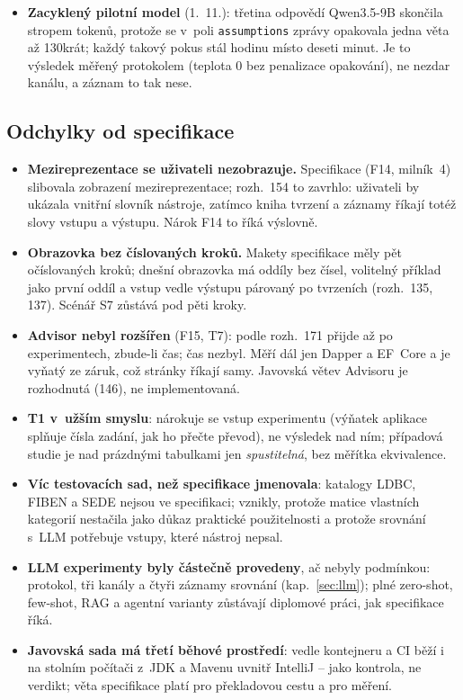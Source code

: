 \documentclass{article}
\begin{document}
\begin{itemize}[leftmargin=*,itemsep=2pt]
\item \textbf{Zacyklený pilotní model} (1.~11.): třetina odpovědí Qwen3.5-9B skončila stropem tokenů, protože se v~poli \texttt{assumptions} zprávy opakovala jedna věta až 130krát; každý takový pokus stál hodinu místo deseti minut. Je to výsledek měřený protokolem (teplota 0 bez penalizace opakování), ne nezdar kanálu, a záznam to tak nese.
\end{itemize}

\subsection{Odchylky od specifikace}\label{sec:odchylky}

\begin{itemize}[leftmargin=*,itemsep=2pt]
\item \textbf{Mezireprezentace se uživateli nezobrazuje.} Specifikace (F14, milník~4) slibovala zobrazení mezireprezentace; rozh.~154 to zavrhlo: uživateli by ukázala vnitřní slovník nástroje, zatímco kniha tvrzení a záznamy říkají totéž slovy vstupu a výstupu. Nárok F14 to říká výslovně.
\item \textbf{Obrazovka bez číslovaných kroků.} Makety specifikace měly pět očíslovaných kroků; dnešní obrazovka má oddíly bez čísel, volitelný příklad jako první oddíl a vstup vedle výstupu párovaný po tvrzeních (rozh.~135, 137). Scénář S7 zůstává pod pěti kroky.
\item \textbf{Advisor nebyl rozšířen} (F15, T7): podle rozh.~171 přijde až po experimentech, zbude-li čas; čas nezbyl. Měří dál jen Dapper a EF~Core a je vyňatý ze záruk, což stránky říkají samy. Javovská větev Advisoru je rozhodnutá (146), ne implementovaná.
\item \textbf{T1 v~užším smyslu}: nárokuje se vstup experimentu (výňatek aplikace splňuje čísla zadání, jak ho přečte převod), ne výsledek nad ním; případová studie je nad prázdnými tabulkami jen \emph{spustitelná}, bez měřítka ekvivalence.
\item \textbf{Víc testovacích sad, než specifikace jmenovala}: katalogy LDBC, FIBEN a SEDE nejsou ve specifikaci; vznikly, protože matice vlastních kategorií nestačila jako důkaz praktické použitelnosti a protože srovnání s~LLM potřebuje vstupy, které nástroj nepsal.
\item \textbf{LLM experimenty byly částečně provedeny}, ač nebyly podmínkou: protokol, tři kanály a čtyři záznamy srovnání (kap.~\ref{sec:llm}); plné zero-shot, few-shot, RAG a agentní varianty zůstávají diplomové práci, jak specifikace říká.
\item \textbf{Javovská sada má třetí běhové prostředí}: vedle kontejneru a CI běží i na stolním počítači z~JDK a Mavenu uvnitř IntelliJ -- jako kontrola, ne verdikt; věta specifikace  platí pro překladovou cestu a pro měření.
\end{itemize}
\end{document}
